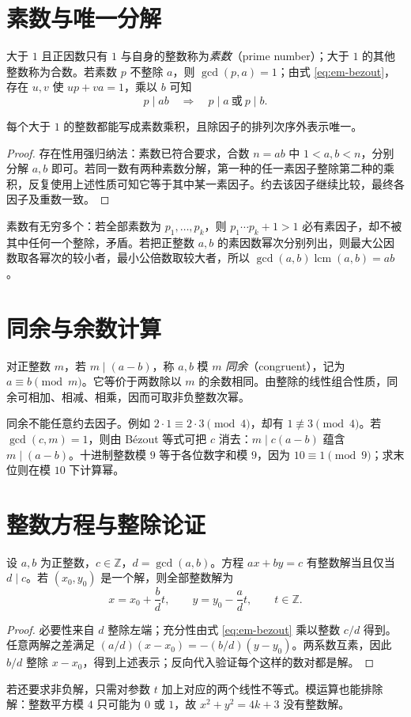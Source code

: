 \section{素数与唯一分解}
大于 $1$ 且正因数只有 $1$ 与自身的整数称为\emph{素数}（prime number）；大于 $1$ 的其他整数称为合数。若素数 $p$ 不整除 $a$，则 $\gcd(p,a)=1$；由式 \eqref{eq:em-bezout}，存在 $u,v$ 使 $up+va=1$，乘以 $b$ 可知
\[
 p\mid ab\quad\Longrightarrow\quad p\mid a\ \text{或}\ p\mid b.
\]
\begin{theorem}[算术基本定理]
每个大于 $1$ 的整数都能写成素数乘积，且除因子的排列次序外表示唯一。
\end{theorem}
\begin{proof}
存在性用强归纳法：素数已符合要求，合数 $n=ab$ 中 $1<a,b<n$，分别分解 $a,b$ 即可。若同一数有两种素数分解，第一种的任一素因子整除第二种的乘积，反复使用上述性质可知它等于其中某一素因子。约去该因子继续比较，最终各因子及重数一致。
\end{proof}
素数有无穷多个：若全部素数为 $p_1,\ldots,p_k$，则 $p_1\cdots p_k+1>1$ 必有素因子，却不被其中任何一个整除，矛盾。若把正整数 $a,b$ 的素因数幂次分别列出，则最大公因数取各幂次的较小者，最小公倍数取较大者，所以 $\gcd(a,b)\operatorname{lcm}(a,b)=ab$。

\section{同余与余数计算}
对正整数 $m$，若 $m\mid(a-b)$，称 $a,b$ 模 $m$ \emph{同余}（congruent），记为 $a\equiv b\pmod m$。它等价于两数除以 $m$ 的余数相同。由整除的线性组合性质，同余可相加、相减、相乘，因而可取非负整数次幂。

同余不能任意约去因子。例如 $2\cdot1\equiv2\cdot3\pmod4$，却有 $1\not\equiv3\pmod4$。若 $\gcd(c,m)=1$，则由 Bézout 等式可把 $c$ 消去：$m\mid c(a-b)$ 蕴含 $m\mid(a-b)$。十进制整数模 $9$ 等于各位数字和模 $9$，因为 $10\equiv1\pmod9$；求末位则在模 $10$ 下计算幂。

\section{整数方程与整除论证}
\begin{theorem}
设 $a,b$ 为正整数，$c\in\mathbb Z$，$d=\gcd(a,b)$。方程 $ax+by=c$ 有整数解当且仅当 $d\mid c$。若 $(x_0,y_0)$ 是一个解，则全部整数解为
\[
 x=x_0+\frac bd t,\qquad y=y_0-\frac ad t,\qquad t\in\mathbb Z.
\]
\end{theorem}
\begin{proof}
必要性来自 $d$ 整除左端；充分性由式 \eqref{eq:em-bezout} 乘以整数 $c/d$ 得到。任意两解之差满足 $(a/d)(x-x_0)=-(b/d)(y-y_0)$。两系数互素，因此 $b/d$ 整除 $x-x_0$，得到上述表示；反向代入验证每个这样的数对都是解。
\end{proof}
若还要求非负解，只需对参数 $t$ 加上对应的两个线性不等式。模运算也能排除解：整数平方模 $4$ 只可能为 $0$ 或 $1$，故 $x^2+y^2=4k+3$ 没有整数解。


